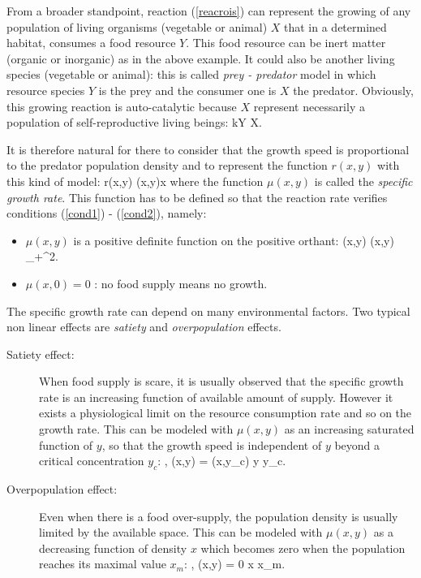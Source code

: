 From a broader standpoint, reaction (\ref{reacrois}) can represent the growing of any population of living organisms (vegetable or animal) $X$ that in a determined habitat, consumes a food resource $Y$.
This food resource can be inert matter (organic or inorganic) as in the above example.
It could also be another living species (vegetable or animal): this is called {\em prey - predator}  model in which resource species $Y$ is the prey and the consumer one is $X$ the predator.
Obviously, this growing reaction is auto-catalytic because $X$ represent necessarily a population of self-reproductive living beings:
\eqnn
kY  X.
\eeqnn

It is therefore natural for there to consider that the growth speed is proportional to the predator population density and to represent the function $r(x,y)$ with this kind of model:
\eqnn
r(x,y) \teq \mu(x,y)x
\eeqnn
where the function $\mu(x,y)$ is called the {\em specific growth rate}.
This function has to be defined so that the reaction rate verifies conditions (\ref{cond1}) - (\ref{cond2}), namely:
\begin{itemize}
\item $\mu(x,y)$ is a positive definite function on the positive orthant:
\eqnn
\mu(x,y)  \hh \hh \forall (x,y) \in {}_{+}^{2}.
\eeqnn
\item $\mu(x,0) = 0$ : no food supply means no growth.
\end{itemize}
The specific growth rate can depend on many environmental factors.
Two typical non linear effects are {\em satiety} and {\em overpopulation} effects.
\begin{description}
\item[Satiety effect: ] When food supply is scare, it is usually observed that the specific growth rate is an increasing function of available amount of supply.
However it exists a physiological limit on the resource consumption rate and so on the growth rate.
This can be modeled with $\mu(x,y)$ as an increasing saturated function of $y$, so that the growth speed is independent of $y$ beyond a critical concentration $y_c$:
\eqnn
{} , \hspace{1cm}
\mu(x,y) = \mu(x,y_{c}) \hh \hh \forall \hh y \geq y_{c}.
\eeqnn
\item[Overpopulation effect:] Even when there is a food over-supply, the population density is usually limited by the available space. This can be modeled with $\mu(x,y)$ as a decreasing function of density $x$ which becomes zero when the population reaches its maximal value $x_m$:
 \eqnn
{} , \hspace{1cm}
\mu(x,y) = 0 \hh \hh \forall \hh x \geq x_{m}.
\eeqnn
\end{description}

